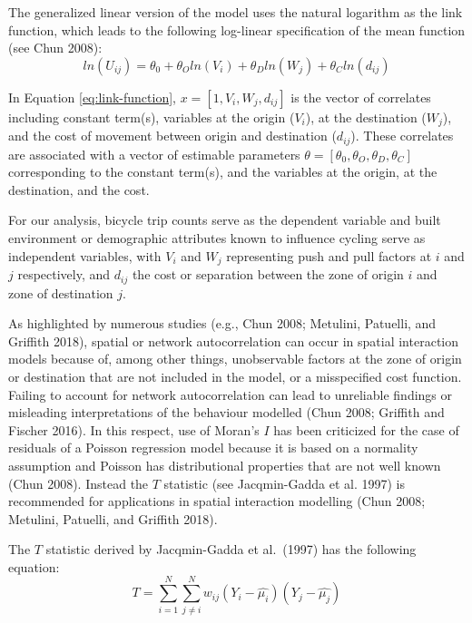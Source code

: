 \documentclass[smallextended]{svjour3}       %
\begin{document}
The generalized linear version of the model uses the natural logarithm
as the link function, which leads to the following log-linear
specification of the mean function (see Chun 2008): \begin{equation}
\label{eq:link-function}
ln(U_{ij}) = \theta_0 + \theta_O ln(V_i) + \theta_Dln(W_j) + \theta_C ln(d_{ij}) 
\end{equation}

In Equation \ref{eq:link-function}, \(x = [1, V_i, W_j, d_{ij}]\) is the
vector of correlates including constant term(s), variables at the origin
(\(V_i\)), at the destination (\(W_j\)), and the cost of movement
between origin and destination (\(d_{ij}\)). These correlates are
associated with a vector of estimable parameters
\(\theta = [\theta_0, \theta_O, \theta_D, \theta_C]\) corresponding to
the constant term(s), and the variables at the origin, at the
destination, and the cost.

For our analysis, bicycle trip counts serve as the dependent variable
and built environment or demographic attributes known to influence
cycling serve as independent variables, with \(V_i\) and \(W_j\)
representing push and pull factors at \(i\) and \(j\) respectively, and
\(d_{ij}\) the cost or separation between the zone of origin \(i\) and
zone of destination \(j\).

As highlighted by numerous studies (e.g., Chun 2008; Metulini, Patuelli,
and Griffith 2018), spatial or network autocorrelation can occur in
spatial interaction models because of, among other things, unobservable
factors at the zone of origin or destination that are not included in
the model, or a misspecified cost function. Failing to account for
network autocorrelation can lead to unreliable findings or misleading
interpretations of the behaviour modelled (Chun 2008; Griffith and
Fischer 2016). In this respect, use of Moran's \(I\) has been criticized
for the case of residuals of a Poisson regression model because it is
based on a normality assumption and Poisson has distributional
properties that are not well known (Chun 2008). Instead the \(T\)
statistic (see Jacqmin-Gadda et al. 1997) is recommended for
applications in spatial interaction modelling (Chun 2008; Metulini,
Patuelli, and Griffith 2018).

The \(T\) statistic derived by Jacqmin-Gadda et al.~(1997) has the
following equation: \begin{equation}
\label{eq:T-statistic}
T = \sum_{i=1}^{N} \sum_{j\ne{i}}^{N} w_{ij}(Y_i - \hat{\mu_i})(Y_j - \hat{\mu_j})
\end{equation}
\end{document}
